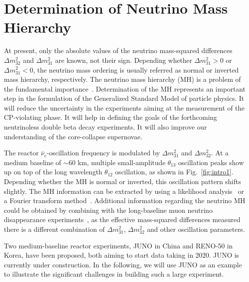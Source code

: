 \newcommand{\fixit}[1]{{\color{red}FIXIT: #1}}
\section{Determination of Neutrino Mass Hierarchy}

At present, only the absolute values of the neutrino mass-squared differences $\Delta m^2_{32}$ and $\Delta m^2_{31}$ are known, not their sign. 
Depending whether $\Delta m^2_{31}>0$ or $\Delta m^2_{31}<0$, the neutrino mass ordering is usually referred as normal or inverted mass hierarchy, respectively. 
The neutrino mass hierarchy (MH) is a problem of the fundamental importance~\cite{MHwhitepaper}.
Determination of the MH represents an important step in the formulation of the Generalized Standard Model of particle physics. 
It will reduce the uncertainty in the experiments aiming at the measurement of the CP-violating phase. 
It will help in defining the goals of the forthcoming neutrinoless double beta decay experiments.
It will also improve our understanding of the core-collapse supernovae.

The reactor $\bar\nu_e$-oscillation frequency is modulated by $\Delta m^2_{31}$ and $\Delta m^2_{32}$. 
At a medium baseline of $\sim$60 km, multiple small-amplitude $\theta_{13}$ oscillation peaks show up on top of the long wavelength $\theta_{12}$ oscillation, as shown in Fig.~\ref{fig:intro1}.
Depending whether the MH is normal or inverted, this oscillation pattern shifts slightly.
The MH information can be extracted by using a likelihood analysis~\cite{Li-PRD13} or a Fourier transform method~\cite{Zhan-PRD08,Zhan-PRD09}. 
Additional information regarding the neutrino MH could be obtained by combining with the long-baseline muon neutrino disappearance experiments~\cite{Minakata}, as the effective mass-squared differences measured there is a different combination of $\Delta m^2_{31}$, $\Delta m^2_{32}$ and other oscillation parameters.

Two medium-baseline reactor experiments, JUNO in China and RENO-50 in Korea, have been proposed, both aiming to start data taking in 2020. JUNO is currently under construction. In the following, we will use JUNO as an example to illustrate the significant challenges in building such a large experiment. 

